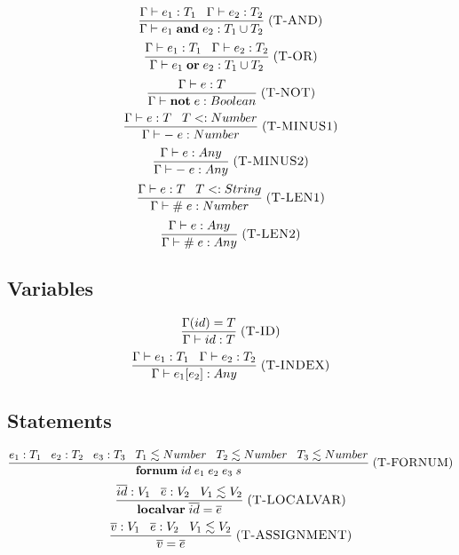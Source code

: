 \documentclass[12pt]{article}
\newcommand{\mylabel}[1]{\; (\textsc{#1})}
\newcommand{\subtype}{<:}
\newcommand{\env}{\Gamma}
\begin{document}
\[
\frac{\env \vdash e_{1}:T_{1} \;\;\; \env \vdash e_{2}:T_{2}}
     {\env \vdash e_{1} \; \mathbf{and} \; e_{2} : T_{1} \cup T_{2}}
\mylabel{T-AND}
\]
\[
\frac{\env \vdash e_{1}:T_{1} \;\;\; \env \vdash e_{2}:T_{2}}
     {\env \vdash e_{1} \; \mathbf{or} \; e_{2} : T_{1} \cup T_{2}}
\mylabel{T-OR}
\]
\[
\frac{\env \vdash e:T}
     {\env \vdash \mathbf{not} \; e : Boolean}
\mylabel{T-NOT}
\]
\[
\frac{\env \vdash e:T \;\;\; T \subtype Number}
     {\env \vdash - \; e : Number}
\mylabel{T-MINUS1}
\]
\[
\frac{\env \vdash e:Any}
     {\env \vdash - \; e : Any}
\mylabel{T-MINUS2}
\]
\[
\frac{\env \vdash e:T \;\;\; T \subtype String}
     {\env \vdash \# \; e : Number}
\mylabel{T-LEN1}
\]
\[
\frac{\env \vdash e:Any}
     {\env \vdash \# \; e : Any}
\mylabel{T-LEN2}
\]

\subsection{Variables}

\[
\frac{\env(id) = T}
     {\env \vdash id : T}
\mylabel{T-ID}
\]
\[
\frac{\env \vdash e_{1}:T_{1} \;\;\; \env \vdash e_{2}:T_{2}}
     {\env \vdash e_{1}[e_{2}] : Any}
\mylabel{T-INDEX}
\]

\subsection{Statements}

\[
\frac{e_{1}:T_{1} \;\;\; e_{2}:T_{2} \;\;\; e_{3}:T_{3} \;\;\;
      T_{1} \lesssim Number \;\;\; T_{2} \lesssim Number \;\;\;
      T_{3} \lesssim Number}
     {\textbf{fornum} \; id \; e_{1} \; e_{2} \; e_{3} \; s}
\mylabel{T-FORNUM}
\]
\[
\frac{\overline{id}:V_{1} \;\;\; \overline{e}:V_2 \;\;\; V_{1} \lesssim V_{2}}
     {\textbf{localvar} \; \overline{id} = \overline{e}}
\mylabel{T-LOCALVAR}
\]
\[
\frac{\overline{v}:V_{1} \;\;\; \overline{e}:V_2 \;\;\; V_{1} \lesssim V_{2}}
     {\overline{v} = \overline{e}}
\mylabel{T-ASSIGNMENT}
\]
\end{document}
